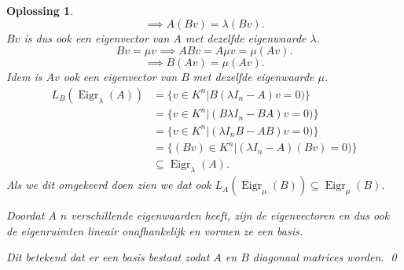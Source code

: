 \documentclass[a4paper,12pt]{article}
\newtheorem{oplossing}{Oplossing}
\begin{document}
\begin{enumerate}
\begin{itemize}
\begin{oplossing}
        \[\implies A(Bv) = \lambda(Bv).\]
        \(Bv\) is dus ook een eigenvector van \(A\) met dezelfde eigenwaarde \(\lambda\).
        \[B v = \mu v \implies ABv = A\mu v = \mu (Av). \]
        \[\implies B(Av) = \mu(Av).\]
        Idem is \(Av\) ook een eigenvector van \(B\) met dezelfde eigenwaarde \(\mu\).
        \begin{align*}
            L_B (\operatorname{Eigr}_\lambda (A))
            &= \{ v\in K^n | B(\lambda I_n - A)v = 0)\} \\
            &= \{ v\in K^n | (B\lambda I_n - BA)v = 0)\} \\
            &=\{ v\in K^n | (\lambda I_n B - A B)v = 0)\} \\
            &= \{ (Bv)\in K^n | (\lambda I_n - A)(Bv) = 0)\}\\
            &\subseteq \operatorname{Eigr}_\lambda (A).
        \end{align*}
        Als we dit omgekeerd doen zien we dat ook \(L_A (\operatorname{Eigr}_\mu (B))\subseteq \operatorname{Eigr}_\mu (B)\).

        Doordat \(A\) \(n\) verschillende eigenwaarden heeft, zijn de eigenvectoren en dus ook de eigenruimten lineair onafhankelijk en vormen ze een basis.

        Dit betekend dat er een basis bestaat zodat \(A\) en \(B\) diagonaal matrices worden.
        \qed
    \end{oplossing}
\end{itemize}

\vspace{0.5cm}


\end{enumerate}
\end{document}
